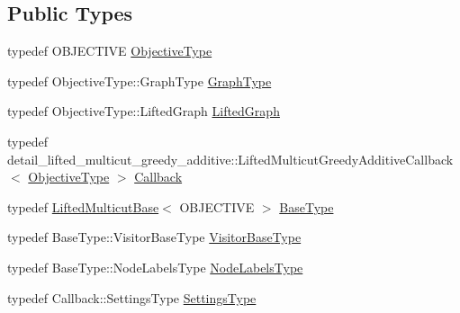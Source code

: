 \subsection*{Public Types}
\begin{DoxyCompactItemize}
\item 
typedef O\+B\+J\+E\+C\+T\+I\+VE \hyperlink{classnifty_1_1graph_1_1opt_1_1lifted__multicut_1_1LiftedMulticutGreedyAdditive_a0aa12ac484718da875bfca390b69811e}{Objective\+Type}
\item 
typedef Objective\+Type\+::\+Graph\+Type \hyperlink{classnifty_1_1graph_1_1opt_1_1lifted__multicut_1_1LiftedMulticutGreedyAdditive_ac29b23b48b0b82a2eb86e0d813f09515}{Graph\+Type}
\item 
typedef Objective\+Type\+::\+Lifted\+Graph \hyperlink{classnifty_1_1graph_1_1opt_1_1lifted__multicut_1_1LiftedMulticutGreedyAdditive_ac2c4949f064dc0f11b0228ec47df37e5}{Lifted\+Graph}
\item 
typedef detail\+\_\+lifted\+\_\+multicut\+\_\+greedy\+\_\+additive\+::\+Lifted\+Multicut\+Greedy\+Additive\+Callback$<$ \hyperlink{classnifty_1_1graph_1_1opt_1_1lifted__multicut_1_1LiftedMulticutGreedyAdditive_a0aa12ac484718da875bfca390b69811e}{Objective\+Type} $>$ \hyperlink{classnifty_1_1graph_1_1opt_1_1lifted__multicut_1_1LiftedMulticutGreedyAdditive_a70cf9bac7d42756343ae2e47877867e4}{Callback}
\item 
typedef \hyperlink{classnifty_1_1graph_1_1opt_1_1lifted__multicut_1_1LiftedMulticutBase}{Lifted\+Multicut\+Base}$<$ O\+B\+J\+E\+C\+T\+I\+VE $>$ \hyperlink{classnifty_1_1graph_1_1opt_1_1lifted__multicut_1_1LiftedMulticutGreedyAdditive_a7cf1a7181ae6580e2c3d73eda804ec75}{Base\+Type}
\item 
typedef Base\+Type\+::\+Visitor\+Base\+Type \hyperlink{classnifty_1_1graph_1_1opt_1_1lifted__multicut_1_1LiftedMulticutGreedyAdditive_a7ae8f1d5534419d919200ed5e74f0f2a}{Visitor\+Base\+Type}
\item 
typedef Base\+Type\+::\+Node\+Labels\+Type \hyperlink{classnifty_1_1graph_1_1opt_1_1lifted__multicut_1_1LiftedMulticutGreedyAdditive_a67a2931a00a97fa2838ed9ae1158c7bf}{Node\+Labels\+Type}
\item 
typedef Callback\+::\+Settings\+Type \hyperlink{classnifty_1_1graph_1_1opt_1_1lifted__multicut_1_1LiftedMulticutGreedyAdditive_aeac1b92946ca3d5e8e9e30f7cc30294d}{Settings\+Type}
\end{DoxyCompactItemize}
